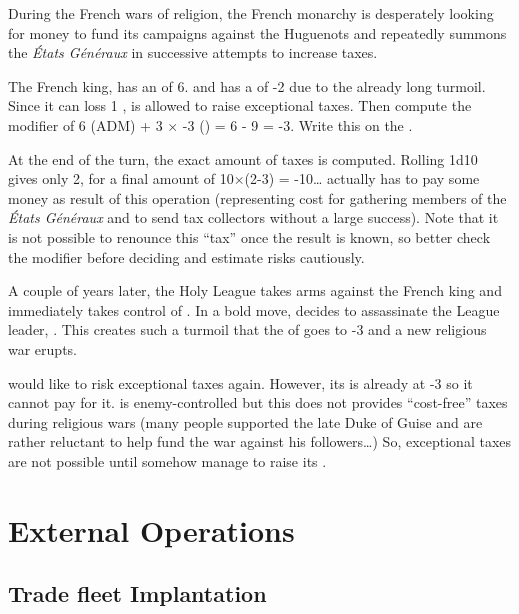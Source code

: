 \begin{exemple}
  During the French wars of religion, the French monarchy is desperately
  looking for money to fund its campaigns against the Huguenots and repeatedly
  summons the \emph{États Généraux} in successive attempts to increase taxes.

  The French king,  has an \ADM of 6. and \FRA has a \STAB
  of -2 due to the already long turmoil. Since it can loss 1 \STAB, \FRA is
  allowed to raise exceptional taxes. Then compute the modifier of 6 (ADM) + 3
  $\times$ -3 (\STAB) = 6 - 9 = -3. Write this on the \EcoRS.

  At the end of the turn, the exact amount of taxes is computed. Rolling 1d10
  gives only 2, for a final amount of 10$\times$(2-3) = -10\ducats\ldots \FRA
  actually has to pay some money as result of this operation (representing
  cost for gathering members of the \emph{États Généraux} and to send tax
  collectors without a large success). Note that it is not possible to
  renounce this ``tax'' once the result is known, so better check the
  modifier before deciding and estimate risks cautiously.

  \smallskip

  A couple of years later, the Holy League takes arms against the French king
  and immediately takes control of \villeParis. In a bold move,
   decides to assassinate the League leader,
  \leaderGuise. This creates such a turmoil that the \STAB of \FRA goes to -3
  and a new religious war erupts.

  \FRA would like to risk exceptional taxes again. However, its \STAB is
  already at -3 so it cannot pay for it. \villeParis is enemy-controlled but
  this does not provides ``cost-free'' taxes during religious wars (many
  people supported the late Duke of Guise and are rather reluctant to help
  fund the war against his followers\ldots) So, exceptional taxes are not
  possible until \FRA somehow manage to raise its \STAB.
\end{exemple}




\section{External Operations}



\subsection{Trade fleet Implantation}


